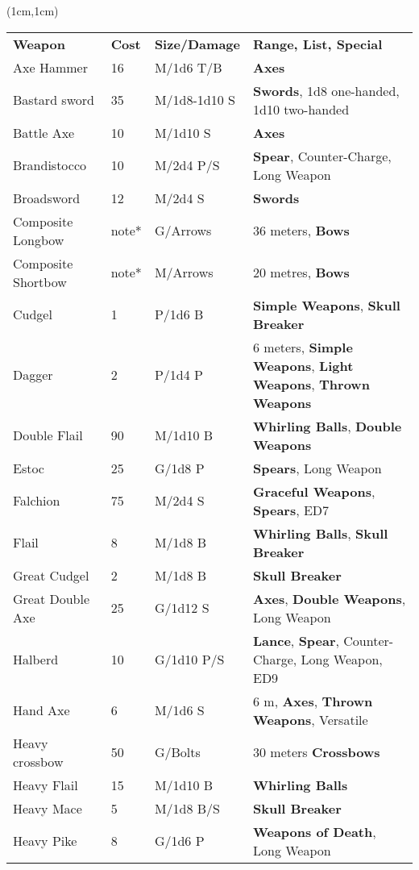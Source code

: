 \documentclass[a4paper,12 pt,openany]{book}
\begin{document}
\begin{textblock*}{19.5cm}(1cm,1cm) %

\begin{tabularx}{0.95\textwidth}{llll}
\textbf{Weapon}&\textbf{Cost}&\textbf{Size/Damage} & \textbf{Range, List, Special}\\

Axe Hammer& 16 & M/1d6 T/B& \textbf{Axes}\\
Bastard sword& 35 & M/1d8-1d10 S&\textbf{Swords}, 1d8 one-handed, 1d10 two-handed\\
Battle Axe& 10 & M/1d10 S&\textbf{Axes}\\
Brandistocco& 10 & M/2d4 P/S& \textbf{Spear}, Counter-Charge, Long Weapon\\
Broadsword& 12 & M/2d4 S&\textbf{Swords}\\
Composite Longbow& note*& G/Arrows& 36 meters, \textbf{Bows}\\
Composite Shortbow& note*& M/Arrows& 20 metres, \textbf{Bows}\\
Cudgel& 1& P/1d6 B& \textbf{Simple Weapons}, \textbf{Skull Breaker}\\
Dagger& 2& P/1d4 P& 6 meters, \textbf{Simple Weapons}, \textbf{Light Weapons}, \textbf{Thrown Weapons}\\
Double Flail& 90 & M/1d10 B& \textbf{Whirling Balls}, \textbf{Double Weapons}\\
Estoc& 25& G/1d8 P& \textbf{Spears}, Long Weapon\\
Falchion& 75 & M/2d4 S& \textbf{Graceful Weapons}, \textbf{Spears}, ED7\\
Flail& 8& M/1d8 B& \textbf{Whirling Balls}, \textbf{Skull Breaker}\\
Great Cudgel& 2& M/1d8 B&\textbf{Skull Breaker}\\
Great Double Axe& 25 & G/1d12 S& \textbf{Axes}, \textbf{Double Weapons}, Long Weapon\\
Halberd& 10 & G/1d10 P/S& \textbf{Lance}, \textbf{Spear}, Counter-Charge, Long Weapon, ED9 \\
Hand Axe& 6 & M/1d6 S& 6 m, \textbf{Axes}, \textbf{Thrown Weapons}, Versatile\\
Heavy crossbow& 50 & G/Bolts& 30 meters \textbf{Crossbows}\\
Heavy Flail& 15 & M/1d10 B& \textbf{Whirling Balls}\\
Heavy Mace& 5& M/1d8 B/S& \textbf{Skull Breaker}\\
Heavy Pike& 8& G/1d6 P&\textbf{Weapons of Death}, Long Weapon\\

\end{tabularx}
\end{textblock*}
\end{document}

